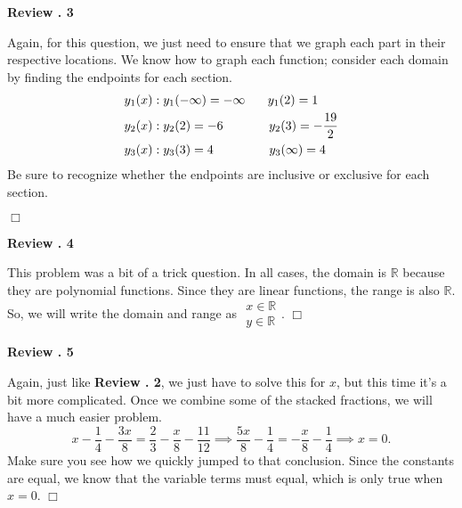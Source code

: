 \documentclass[lang=en,11pt]{elegantbook}
\begin{document}
\noindent \textbf{Review . 3}

Again, for this question, we just need to ensure that we graph each part in their respective locations.  We know how to graph each function; consider each domain by finding the endpoints for each section. \begin{align*}
    y_1(x) &: y_1(-\infty)=-\infty \hspace{0.25in} y_1(2)=1 \\
    y_2(x) &: y_2(2)=-6 \hspace{0.51in} y_2(3)=-\dfrac{19}{2} \\
    y_3(x) &: y_3(3)=4 \hspace{0.62in} y_3(\infty)=4
\end{align*}
Be sure to recognize whether the endpoints are inclusive or exclusive for each section.
\begin{figure}[!h]
    \centering
\end{figure} $\Box$\vspace{3mm}

\noindent \textbf{Review . 4}

This problem was a bit of a trick question.  In all cases, the domain is $\mathbb{R}$ because they are polynomial functions.  Since they are linear functions, the range is also $\mathbb{R}$.  So, we will write the domain and range as $\boxed{\begin{matrix} x\in\mathbb{R} \\ y\in\mathbb{R}\end{matrix}}$. $\Box$

\noindent \textbf{Review . 5}

Again, just like \textbf{Review . 2}, we just have to solve this for $x$, but this time it's a bit more complicated.  Once we combine some of the stacked fractions, we will have a much easier problem.  $$x-\dfrac{1}{4}-\dfrac{3x}{8}=\dfrac{2}{3}-\dfrac{x}{8}-\dfrac{11}{12} \implies \dfrac{5x}{8}-\dfrac{1}{4}=-\dfrac{x}{8}-\dfrac{1}{4} \implies \boxed{x=0}.$$ 
Make sure you see how we quickly jumped to that conclusion.  Since the constants are equal, we know that the variable terms must equal, which is only true when $x=0$.  $\Box$\vspace{3mm}
\end{document}
